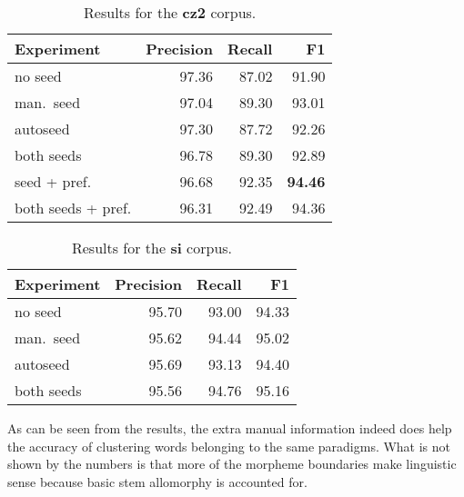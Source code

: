\documentclass{itatnew}
\begin{document}
\begin{table}[h]
\begin{center}
\begin{tabular}{|l|r|r|r|}
\hline \bf Experiment & \bf Precision & \bf Recall & \bf F1\\ \hline
no seed & 97.36 & 87.02 & 91.90\\
man.~seed & 97.04 & 89.30 & 93.01 \\
autoseed & 97.30 & 87.72 & 92.26\\
both seeds & 96.78 & 89.30  & 92.89\\
seed + pref. & 96.68 & 92.35 & \bf 94.46\\
both seeds + pref. & 96.31 & 92.49 & 94.36\\
\hline
\end{tabular}
\end{center}
\caption{\label{table:res-cz2} Results for the \textbf{cz2} corpus.}
\end{table}

\begin{table}[h]
\begin{center}
\begin{tabular}{|l|r|r|r|}
\hline \bf Experiment & \bf Precision & \bf Recall & \bf F1\\ \hline
no seed & 95.70 & 93.00 & 94.33\\
man.~seed & 95.62 & 94.44 & 95.02 \\
autoseed & 95.69 & 93.13 & 94.40\\
both seeds & 95.56  & 94.76 & 95.16\\
\hline
\end{tabular}
\end{center}
\caption{\label{table:res-si} Results for the \textbf{si} corpus.}
\end{table}

As can be seen from the results, the extra manual information indeed does help the accuracy of clustering words belonging to the same paradigms.
What is not shown by the numbers is that more of the morpheme boundaries make linguistic sense because basic stem allomorphy is accounted for. 
\end{document}
